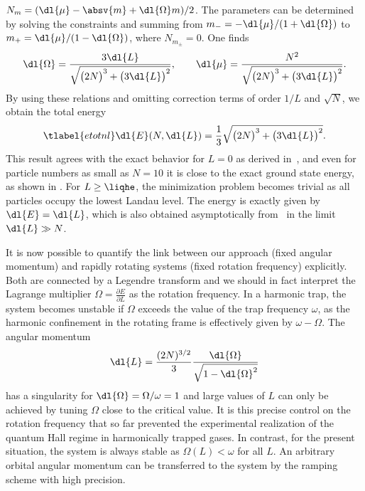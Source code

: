 $N_m=(\dl{\mu}-\absv{m}+\dl{\Omega} m)/2$.
The parameters can be determined by solving the constraints and summing from $m_-=-\dl{\mu}/(1+\dl{\Omega})$ to $m_+=\dl{\mu}/(1-\dl{\Omega})$, where $N_{m_\pm}=0$. One finds
\begin{align}
\dl{\Omega} = \frac{3 \dl{L}}{\sqrt{\big(2N\big)^3 + \big(3\dl{L}\big)^2}}, \qquad \dl{\mu}= \frac{N^2}{\sqrt{\big(2N\big)^3 + \big(3\dl{L}\big)^2}}.
\end{align}
By using these relations and omitting correction terms of order $1/L$ and $\sqrt{N}$, we obtain the total energy
\begin{align} \tlabel{etotnl}
\dl{E}(N,\dl{L})= \frac{1}{3} \sqrt{\big(2N\big)^3 + \big(3\dl{L}\big)^2}.
\end{align}
This result agrees with the exact behavior for $L=0$ as derived in~, and even for particle numbers as small as $N=10$ it is close to the exact ground state energy, as shown in . For $L\ge\liqhe$, the minimization problem becomes trivial as all particles occupy the lowest Landau level. The energy is exactly given by $\dl{E}=\dl{L}$, which is also obtained asymptotically from~ in the limit $\dl{L}\gg N$.

It is now possible to quantify the link between our approach (fixed angular momentum) and rapidly rotating systems (fixed rotation frequency) explicitly. Both are connected by a Legendre transform and we should in fact interpret the Lagrange multiplier $\Omega=\frac{\partial E}{\partial L}$
as the rotation frequency. In a harmonic trap, the system becomes unstable if $\Omega$ exceeds the value of the trap frequency $\omega$, as the harmonic confinement in the rotating frame is effectively given by $\omega-\Omega$. The angular momentum
\begin{align}
\dl{L}=\frac{(2N)^{3/2}}{3} \frac{\dl{\Omega}}{\sqrt{1-\dl{\Omega}^2}}
\end{align}
has a singularity for $\dl{\Omega}=\Omega/\omega=1$ and large values of $L$ can only be achieved by tuning $\Omega$ close to the critical value. It is this precise control on the rotation frequency that so far prevented the experimental realization of the quantum Hall regime in harmonically trapped gases. In contrast, for the present situation, the system is always stable as $\Omega(L)<\omega$ for all $L$. An arbitrary orbital angular momentum can be transferred to the system by the ramping scheme with high precision.



